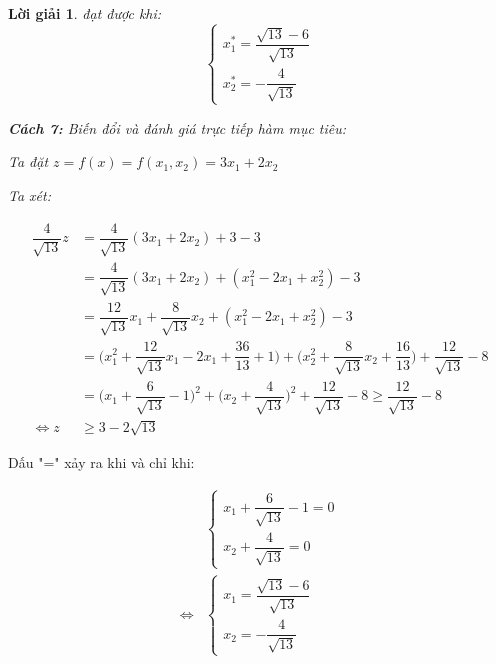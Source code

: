 \documentclass[14pt, a4paper]{article}
\theoremstyle{sltheorem}
\theoremstyle{soltheorem}
\newtheorem*{loigiai}{Lời giải}
\begin{document}
\begin{loigiai}
        đạt được khi:
        \begin{equation*}
            \begin{cases} 
                x_1^* = \dfrac{\sqrt{13} - 6}{\sqrt{13}} \\ 
                x_2^* = - \dfrac{4}{\sqrt{13}} 
            \end{cases}
        \end{equation*}

        \textbf{Cách 7:} Biến đổi và đánh giá trực tiếp hàm mục tiêu:

        Ta đặt $z = f(x) = f(x_1, x_2) = 3 x_1 + 2 x_2$

        Ta xét:

        \begin{equation*}
            \begin{aligned}
            \dfrac{4}{\sqrt{13}} z &= \dfrac{4}{\sqrt{13}} (3 x_1 + 2 x_2 ) + 3 - 3 \\
                                & = \dfrac{4}{\sqrt{13}} (3 x_1 + 2 x_2 ) + (x_1^2 - 2x_1 + x_2^2) - 3 \\
                                & = \dfrac{12}{\sqrt{13}} x_1 + \dfrac{8}{\sqrt{13}} x_2 + (x_1^2 - 2x_1 + x_2^2) - 3 \\
                                & = \Big ( x_1^2 + \dfrac{12}{\sqrt{13}} x_1 - 2 x_1 + \dfrac{36}{13} + 1 \Big) + \Big ( x_2^2 + \dfrac{8}{\sqrt{13}}x_2 + \dfrac{16}{13} \Big) + \dfrac{12}{\sqrt{13}} - 8 \\
                                & = \Big ( x_1 + \dfrac{6}{\sqrt{13}} - 1 \Big)^2 + \Big( x_2 + \dfrac{4}{\sqrt{13}} \Big)^2 + \dfrac{12}{\sqrt{13}} - 8 \geq \dfrac{12}{\sqrt{13}} - 8 \\
                        \Leftrightarrow z &\geq 3 - 2\sqrt{13}
            \end{aligned}
        \end{equation*}
    \end{loigiai}

    Dấu "=" xảy ra khi và chỉ khi:

    \begin{equation}
        \begin{aligned}
        &\begin{cases}
            x_1 + \dfrac{6}{\sqrt{13}} - 1 = 0 \\ 
            x_2 + \dfrac{4}{\sqrt{13}} = 0 
        \end{cases} \\
        \Leftrightarrow & \begin{cases}
            x_1 = \dfrac{\sqrt{13} - 6}{\sqrt{13}} \\ 
            x_2 = - \dfrac{4}{\sqrt{13}} 
        \end{cases}
        \end{aligned}
    \end{equation}
\end{document}
